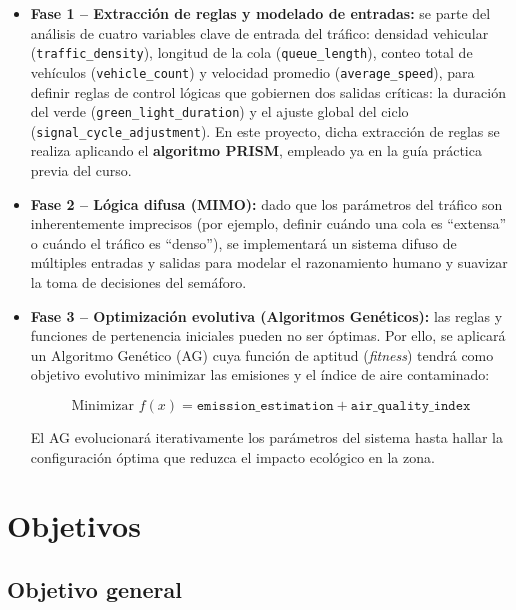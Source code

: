 \documentclass[12pt,a4paper]{article}
\begin{document}
\begin{itemize}
 \item \textbf{Fase 1 -- Extracción de reglas y modelado de entradas:}
 se parte del análisis de cuatro variables clave de entrada del
 tráfico: densidad vehicular (\texttt{traffic\_density}), longitud de
 la cola (\texttt{queue\_length}), conteo total de vehículos
 (\texttt{vehicle\_count}) y velocidad promedio
 (\texttt{average\_speed}), para definir reglas de control lógicas que
 gobiernen dos salidas críticas: la duración del verde
 (\texttt{green\_light\_duration}) y el ajuste global del ciclo
 (\texttt{signal\_cycle\_adjustment}). En este proyecto, dicha
 extracción de reglas se realiza aplicando el \textbf{algoritmo
 PRISM}, empleado ya en la guía práctica previa del curso.

 \item \textbf{Fase 2 -- Lógica difusa (MIMO):} dado que los
 parámetros del tráfico son inherentemente imprecisos (por ejemplo,
 definir cuándo una cola es ``extensa'' o cuándo el tráfico es
 ``denso''), se implementará un sistema difuso de múltiples entradas y
 salidas para modelar el razonamiento humano y suavizar la toma de
 decisiones del semáforo.

 \item \textbf{Fase 3 -- Optimización evolutiva (Algoritmos
 Genéticos):} las reglas y funciones de pertenencia iniciales pueden
 no ser óptimas. Por ello, se aplicará un Algoritmo Genético (AG) cuya
 función de aptitud (\textit{fitness}) tendrá como objetivo evolutivo
 minimizar las emisiones y el índice de aire contaminado:

 \begin{equation}
 \text{Minimizar } f(x) = \texttt{emission\_estimation} +
 \texttt{air\_quality\_index}
 \end{equation}

 El AG evolucionará iterativamente los parámetros del sistema hasta
 hallar la configuración óptima que reduzca el impacto ecológico en la
 zona.
\end{itemize}


\section{Objetivos}

\subsection{Objetivo general}
\end{document}
